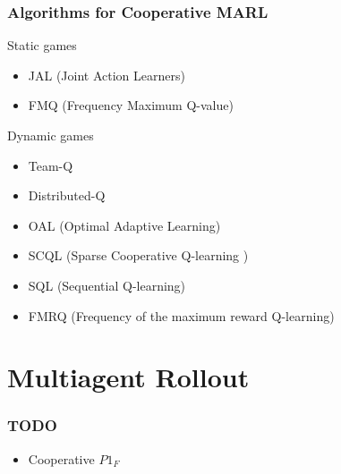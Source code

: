 \documentclass{beamer}
\begin{document}
    \begin{frame}
        \frametitle{Algorithms for Cooperative MARL}

        \begin{block}{Static games}
            \begin{itemize}
                \item JAL (Joint Action Learners)
                \item FMQ (Frequency Maximum Q-value)
            \end{itemize}

        \end{block}

        \begin{block}{Dynamic games}
            \begin{itemize}
                \item Team-Q
                \item Distributed-Q
                \item OAL (Optimal Adaptive Learning)
                \item SCQL (Sparse Cooperative Q-learning )
                \item SQL (Sequential Q-learning)
                \item FMRQ (Frequency of the maximum reward Q-learning)
            \end{itemize}
        \end{block}

    \end{frame}





























    \section{Multiagent Rollout}

    \begin{frame}
        \frametitle{TODO}
        \begin{itemize}
            \item Cooperative $P1_F$

        \end{itemize}
    \end{frame}
\end{document}
